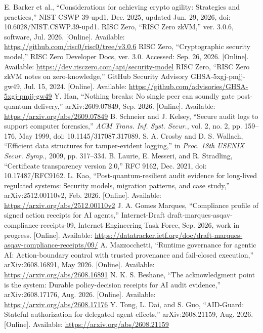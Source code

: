  E. Barker et al., ``Considerations for achieving crypto agility: Strategies and practices,'' NIST CSWP 39-upd1, Dec. 2025, updated Jun. 29, 2026, doi: 10.6028/NIST.CSWP.39-upd1.
 RISC Zero, ``RISC Zero zkVM,'' ver. 3.0.6, software, Jul. 2026. [Online]. Available: \url{https://github.com/risc0/risc0/tree/v3.0.6}
 RISC Zero, ``Cryptographic security model,'' RISC Zero Developer Docs, ver. 3.0. Accessed: Sep. 26, 2026. [Online]. Available: \url{https://dev.risczero.com/api/security-model}
 RISC Zero, ``RISC Zero zkVM notes on zero-knowledge,'' GitHub Security Advisory GHSA-5xgj-pmjj-gw49, Jul. 15, 2024. [Online]. Available: \url{https://github.com/advisories/GHSA-5xgj-pmjj-gw49}
 Y. Han, ``Nothing breaks: No single peer can soundly gate post-quantum delivery,'' arXiv:2609.07849, Sep. 2026. [Online]. Available: \url{https://arxiv.org/abs/2609.07849}
 B. Schneier and J. Kelsey, ``Secure audit logs to support computer forensics,'' \emph{ACM Trans. Inf. Syst. Secur.}, vol. 2, no. 2, pp. 159--176, May 1999, doi: 10.1145/317087.317089.
 S. A. Crosby and D. S. Wallach, ``Efficient data structures for tamper-evident logging,'' in \emph{Proc. 18th USENIX Secur. Symp.}, 2009, pp. 317--334.
 B. Laurie, E. Messeri, and R. Stradling, ``Certificate transparency version 2.0,'' RFC 9162, Dec. 2021, doi: 10.17487/RFC9162.
 L. Kao, ``Post-quantum-resilient audit evidence for long-lived regulated systems: Security models, migration patterns, and case study,'' arXiv:2512.00110v2, Feb. 2026. [Online]. Available: \url{https://arxiv.org/abs/2512.00110v2}
 J. A. Gomes Marques, ``Compliance profile of signed action receipts for AI agents,'' Internet-Draft draft-marques-asqav-compliance-receipts-09, Internet Engineering Task Force, Sep. 2026, work in progress. [Online]. Available: \url{https://datatracker.ietf.org/doc/draft-marques-asqav-compliance-receipts/09/}
 A. Mazzocchetti, ``Runtime governance for agentic AI: Action-boundary control with trusted provenance and fail-closed execution,'' arXiv:2608.16891, May 2026. [Online]. Available: \url{https://arxiv.org/abs/2608.16891}
 N. K. S. Beshane, ``The acknowledgment point is the system: Durable policy-decision receipts for AI audit evidence,'' arXiv:2608.17176, Aug. 2026. [Online]. Available: \url{https://arxiv.org/abs/2608.17176}
 Y. Tong, L. Dai, and S. Guo, ``AID-Guard: Stateful authorization for delegated agent effects,'' arXiv:2608.21159, Aug. 2026. [Online]. Available: \url{https://arxiv.org/abs/2608.21159}
